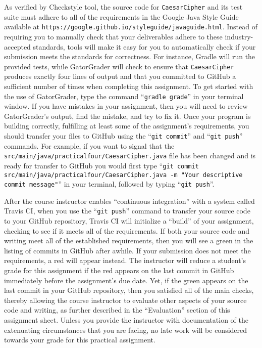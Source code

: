 \documentclass[11pt]{article}
\newcommand{\mainprogram}{\lstinline{CaesarCipher}}
\newcommand{\mainprogramsource}{\lstinline{src/main/java/practicalfour/CaesarCipher.java}}
\newcommand{\gatorgraderstart}{\command{gradle grade}}
\newcommand{\gitcommit}{\command{git commit}}
\newcommand{\gitpush}{\command{git push}}
\newcommand{\gitcommitmainprogram}{\command{git commit src/main/java/practicalfour/CaesarCipher.java -m "Your
descriptive commit message"}}
\newcommand{\command}[1]{``\lstinline{#1}''}
\newcommand{\url}[1]{\lstinline{#1}}
\newcommand{\step}[1]{``{#1}''}
\newcommand{\checkmark}{\ding{51}}
\newcommand{\naughtmark}{\ding{55}}
\begin{document}
As verified by Checkstyle tool, the source code for \mainprogram{} and its test
suite must adhere to all of the requirements in the Google Java Style Guide
available at \url{https://google.github.io/styleguide/javaguide.html}. Instead
of requiring you to manually check that your deliverables adhere to these
industry-accepted standards, tools will make it easy for you to automatically
check if your submission meets the standards for correctness. For instance,
Gradle will run the provided tests, while GatorGrader will check to ensure that
\mainprogram{} produces exactly four lines of output and that you committed to
GitHub a sufficient number of times when completing this assignment. To get
started with the use of GatorGrader, type the command \gatorgraderstart{} in
your terminal window. If you have mistakes in your assignment, then you will
need to review GatorGrader's output, find the mistake, and try to fix it. Once
your program is building correctly, fulfilling at least some of the assignment's
requirements, you should transfer your files to GitHub using the \gitcommit{}
and \gitpush{} commands. For example, if you want to signal that the
\mainprogramsource{} file has been changed and is ready for transfer to GitHub
you would first type \gitcommitmainprogram{} in your terminal, followed by
typing \gitpush{}.

After the course instructor enables \step{continuous integration} with a system
called Travis CI, when you use the \gitpush{} command to transfer your source
code to your GitHub repository, Travis CI will initialize a \step{build} of your
assignment, checking to see if it meets all of the requirements. If both your
source code and writing meet all of the established requirements, then you will
see a green \checkmark{} in the listing of commits in GitHub after awhile. If
your submission does not meet the requirements, a red \naughtmark{} will appear
instead. The instructor will reduce a student's grade for this assignment if the
red \naughtmark{} appears on the last commit in GitHub immediately before the
assignment's due date. Yet, if the green \checkmark{} appears on the last commit
in your GitHub repository, then you satisfied all of the main checks, thereby
allowing the course instructor to evaluate other aspects of your source code and
writing, as further described in the \step{Evaluation} section of this
assignment sheet. Unless you provide the instructor with documentation of the
extenuating circumstances that you are facing, no late work will be considered
towards your grade for this practical assignment.
\end{document}
